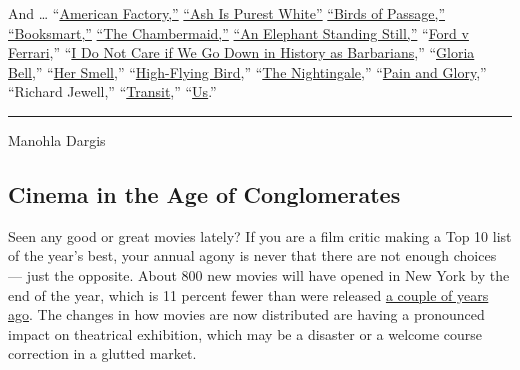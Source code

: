 And \ldots{}
``\href{https://www.nytimes.com/2019/08/20/movies/american-factory-review.html}{American
Factory,''}
\href{https://www.nytimes.com/2019/03/13/movies/ash-is-purest-white-review.html}{``Ash
Is Purest White''}
\href{https://www.nytimes.com/2019/02/12/movies/birds-of-passage-review.html}{``Birds
of Passage,''}
\href{https://www.nytimes.com/2019/05/22/movies/booksmart-review.html}{``Booksmart,''}
\href{https://www.nytimes.com/2019/06/25/movies/the-chambermaid-review.html}{``The
Chambermaid,''}
\href{https://www.nytimes.com/2019/03/06/movies/an-elephant-sitting-still-review.html}{``An
Elephant Standing Still,''}
``\href{https://www.nytimes.com/2019/11/14/movies/ford-v-ferrari-review.html}{Ford
v Ferrari},''
``\href{https://www.nytimes.com/2019/07/18/movies/i-do-not-care-we-go-down-history-barbarians-review.html}{I
Do Not Care if We Go Down in History as Barbarians},''
``\href{https://www.nytimes.com/2019/03/07/movies/gloria-bell-review.html}{Gloria
Bell},''
``\href{https://www.nytimes.com/2019/04/10/movies/her-smell-review.html}{Her
Smell},''
``\href{https://www.nytimes.com/2019/02/07/movies/high-flying-bird-review.html}{High-Flying
Bird},''
``\href{https://www.nytimes.com/2019/08/01/movies/nightingale-review.html}{The
Nightingale},''
``\href{https://www.nytimes.com/2019/10/03/movies/pain-and-glory-review.html}{Pain
and Glory},'' ``Richard Jewell,''
``\href{https://www.nytimes.com/2019/02/28/movies/transit-review.html}{Transit},''
``\href{https://www.nytimes.com/2019/03/20/movies/us-movie-review.html}{Us}.''

\begin{center}\rule{0.5\linewidth}{\linethickness}\end{center}

Manohla Dargis

\hypertarget{cinema-in-the-age-of-conglomerates}{%
\subsection{Cinema in the Age of
Conglomerates}\label{cinema-in-the-age-of-conglomerates}}

Seen any good or great movies lately? If you are a film critic making a
Top 10 list of the year's best, your annual agony is never that there
are not enough choices --- just the opposite. About 800 new movies will
have opened in New York by the end of the year, which is 11 percent
fewer than were released
\href{https://www.nytimes.com/2014/01/12/movies/flooding-theaters-isnt-good-for-filmmakers-or-filmgoers.html}{a
couple of years ago}. The changes in how movies are now distributed are
having a pronounced impact on theatrical exhibition, which may be a
disaster or a welcome course correction in a glutted market.

